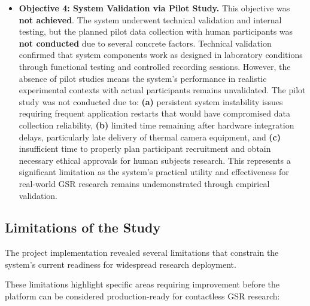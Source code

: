\documentclass[12pt,a4paper]{article}
\begin{document}
\begin{itemize}
\tightlist
\item
  \textbf{Objective 4: System Validation via Pilot Study.} This objective was \textbf{not achieved}. The system underwent technical validation and internal testing, but the planned pilot data collection with human participants was \textbf{not conducted} due to several concrete factors. Technical validation confirmed that system components work as designed in laboratory conditions through functional testing and controlled recording sessions. However, the absence of pilot studies means the system's performance in realistic experimental contexts with actual participants remains unvalidated. The pilot study was not conducted due to: \textbf{(a)} persistent system instability issues requiring frequent application restarts that would have compromised data collection reliability, \textbf{(b)} limited time remaining after hardware integration delays, particularly late delivery of thermal camera equipment, and \textbf{(c)} insufficient time to properly plan participant recruitment and obtain necessary ethical approvals for human subjects research. This represents a significant limitation as the system's practical utility and effectiveness for real-world GSR research remains undemonstrated through empirical validation.
\end{itemize}

\subsection{Limitations of the Study}\label{limitations-of-the-study}

The project implementation revealed several limitations that constrain the system's current readiness for widespread research deployment.

 These limitations highlight specific areas requiring improvement before the platform can be considered production-ready for contactless GSR research:
\end{document}
